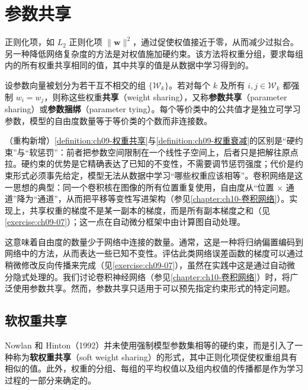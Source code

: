 \documentclass[../../main.tex]{subfiles}
\begin{document}
\section{参数共享}\label{section:ch09-参数共享}

正则化项，如 $L_{2}$ 正则化项 $\|\boldsymbol{w}\|^{2}$，通过促使权值接近于零，从而减少过拟合。另一种降低网络复杂度的方法是对权值施加硬约束。该方法将权重分组，要求每组内的所有权重共享相同的值，其中共享的值是从数据中学习得到的。

\begin{definition}[权重共享]\label{definition:ch09-权重共享}
设参数向量被划分为若干互不相交的组 $\{\mathcal{W}_{k}\}$。若对每个 $k$ 及所有 $i,j\in\mathcal{W}_{k}$ 都强制 $w_{i}=w_{j}$，则称这些权重\textbf{共享}（weight sharing），又称\textbf{参数共享}（parameter sharing）或\textbf{参数捆绑}（parameter tying）。每个等价类中的公共值才是独立可学习参数，模型的自由度数量等于等价类的个数而非连接数。
\end{definition}

\begin{remark}（重构新增）\cref{definition:ch09-权重共享}与\cref{definition:ch09-权重衰减}的区别是“硬约束”与“软惩罚”：前者把参数空间限制在一个线性子空间上，后者只是把解往原点拉。硬约束的优势是它精确表达了已知的不变性，不需要调节惩罚强度；代价是约束形式必须事先给定，模型无法从数据中学习“哪些权重应该相等”。卷积网络是这一思想的典型：同一个卷积核在图像的所有位置重复使用，自由度从“位置 $\times$ 通道”降为“通道”，从而把平移等变性写进架构（参见\cref{chapter:ch10-卷积网络}）。实现上，共享权重的梯度不是某一副本的梯度，而是所有副本梯度之和（见\cref{exercise:ch09-07}）；这一点在自动微分框架中由计算图自动处理。
\end{remark}

这意味着自由度的数量少于网络中连接的数量。通常，这是一种将归纳偏置编码到网络中的方法，从而表达一些已知不变性。评估此类网络误差函数的梯度可以通过稍微修改反向传播来完成（见\cref{exercise:ch09-07}），虽然在实践中这是通过自动微分隐式处理的。我们讨论卷积神经网络（参见\cref{chapter:ch10-卷积网络}）时，将广泛使用参数共享。然而，参数共享只适用于可以预先指定约束形式的特定问题。

\subsection{软权重共享}\label{subsection:ch09-软权重共享}

Nowlan 和 Hinton（1992）并未使用强制模型参数集相等的硬约束，而是引入了一种称为\textbf{软权重共享}（soft weight sharing）的形式，其中正则化项促使权重组具有相似的值。此外，权重的分组、每组的平均权值以及组内权值的传播都是作为学习过程的一部分来确定的。
\end{document}
